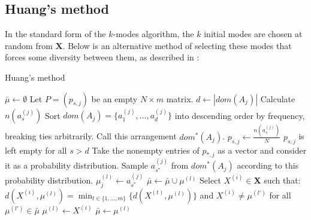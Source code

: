 \documentclass{article}
\theoremstyle{definition}
\begin{document}
\subsection{Huang's method}\label{subsection:huang}

In the standard form of the $k$-modes algorithm, the $k$ initial modes are 
chosen at random from $\textbf{X}$. Below is an alternative method of selecting
these modes that forces some diversity between them, as described in 
\cite{Huang98}:

\begin{algorithm}[H]
\caption{Huang's method}\label{alg:huang}
    \begin{algorithmic}[0]
        \State $\bar{\mu} \gets \emptyset$
	\State Let $P = (p_{s,j})$ be an empty $N \times m$ matrix.
	    \State $d \gets |dom(A_j)|$
		\State Calculate $n(a_s^{(j)})$
	    \EndFor
	    \State Sort $dom(A_j) = \{a_1^{(j)}, \ldots, a_d^{(j)}\}$ into 
            descending order by frequency, breaking ties arbitrarily.
	    \State Call this arrangement $dom^*(A_j)$.
	        \State $p_{s,j} \gets \frac{n(a_s^{(j)})}{N}$
	    \EndFor
	    \State $p_{s,j}$ is left empty for all $s > d$
	\EndFor
		\State Take the nonempty entries of $p_{*,j}$ as a vector and consider 
            it as a probability distribution.
		\State Sample $a_{s^*}^{(j)}$ from $dom^*(A_j)$ according to this 
            probability distribution.
		\State $\mu_j^{(l)} \gets a_{s^*}^{(j)}$
	    \EndFor
	    \State $\bar{\mu} \gets \bar{\mu} \cup \mu^{(l)}$
	\EndFor
	    \State Select $X^{(i)} \in \textbf{X}$ such that: 
            $d(X^{(i)}, \mu^{(l)}) = \min_{t \in \{1, \ldots, m\}} 
		    \{d(X^{(t)}, \mu^{(l)})\}$ and $X^{(i)} \ne \mu^{(l')}$ for all 
		    $\mu^{(l')} \in \bar{\mu}$
	    \State $\mu^{(l)} \gets X^{(i)}$
	    \State $\bar{\mu} \gets \mu^{(l)}$
	\EndFor
    \end{algorithmic}
\end{algorithm} 
\end{document}
